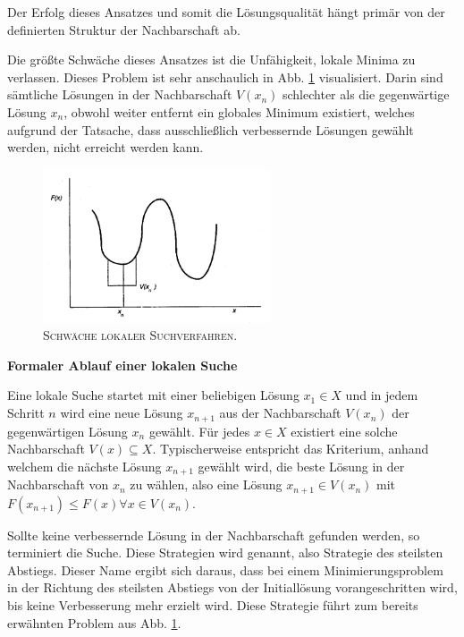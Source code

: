 Der Erfolg dieses Ansatzes und somit die Lösungsqualität hängt primär von der definierten Struktur der Nachbarschaft ab. \cite{Pirlot1996}

Die größte Schwäche dieses Ansatzes ist die Unfähigkeit, lokale Minima zu verlassen. Dieses Problem ist sehr
anschaulich in Abb. \ref{fig:local_search_weakness} visualisiert. Darin sind sämtliche Lösungen in der Nachbarschaft $V(x_n)$ schlechter
als die gegenwärtige Lösung $x_n$, obwohl weiter entfernt ein globales Minimum existiert, welches
aufgrund der Tatsache, dass ausschließlich verbessernde Lösungen gewählt werden, nicht erreicht werden kann.

\begin{figure}[H]
\centering
\includegraphics[width=0.6\textwidth]{img/local_minimum.png}
\caption{\textsc{Schwäche lokaler Suchverfahren. \cite{Pirlot1996}}}
\label{fig:local_search_weakness}
\end{figure}

\textbf{Formaler Ablauf einer lokalen Suche}

Eine lokale Suche startet mit einer beliebigen Lösung $x_1 \in X$ und in jedem Schritt $n$
wird eine neue Lösung $x_{n+1}$ aus der Nachbarschaft $V(x_n)$ der gegenwärtigen Lösung $x_n$ gewählt.
Für jedes $x \in X$ existiert eine solche Nachbarschaft $V(x) \subseteq X$.
Typischerweise entspricht das Kriterium, anhand welchem die nächste Lösung $x_{n+1}$ gewählt wird,
die beste Lösung in der Nachbarschaft von $x_n$ zu wählen, also eine Lösung $x_{n+1} \in V(x_n)$
mit $F(x_{n+1}) \leq F(x) \forall x \in V(x_n)$. \cite{Pirlot1996}

Sollte keine verbessernde Lösung in der Nachbarschaft gefunden werden, so terminiert die Suche.
Diese Strategien wird  genannt, also Strategie des steilsten Abstiegs.
Dieser Name ergibt sich daraus, dass bei einem Minimierungsproblem in der Richtung des steilsten Abstiegs
von der Initiallösung vorangeschritten wird, bis keine Verbesserung mehr erzielt wird. Diese Strategie führt zum
bereits erwähnten Problem aus Abb. \ref{fig:local_search_weakness}.

